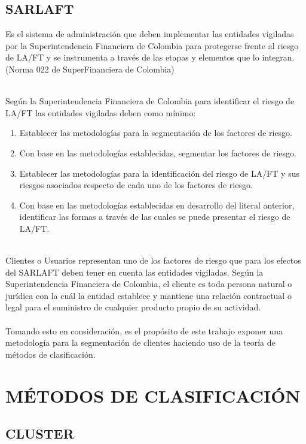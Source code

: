 \documentclass[letterpaper,12pt, spanish]{article}
\begin{document}
\subsection{SARLAFT}

Es el sistema de administración que deben implementar las entidades vigiladas por la Superintendencia Financiera de Colombia para protegerse frente al riesgo de LA/FT y se instrumenta a través de las etapas y elementos que lo integran. (Norma 022 de SuperFinanciera de Colombia)

\ \\
Según la Superintendencia Financiera de Colombia para identificar el riesgo de LA/FT las entidades vigiladas deben como mínimo:
\begin{enumerate}
  \item Establecer las metodologías para la segmentación de los factores de riesgo.
  \item Con base en las metodologías establecidas, segmentar los factores de riesgo.
  \item Establecer las metodologías para la identificación del riesgo de LA/FT y sus riesgos asociados respecto de cada uno de los factores de riesgo.
  \item Con base en las metodologías establecidas en desarrollo del literal anterior, identificar las formas a
      través de las cuales se puede presentar el riesgo de LA/FT.
\end{enumerate}
\ \\
Clientes o Usuarios representan uno de los factores de riesgo que para los efectos del SARLAFT deben tener en cuenta las entidades vigiladas. Según la Superintendencia Financiera de Colombia, el cliente es toda persona natural o jurídica con la cuál la entidad establece y mantiene una relación contractual o legal para el suministro de cualquier producto propio de su actividad.
\ \\
\ \\
Tomando esto en consideración, es el propósito de este trabajo exponer una metodología para la segmentación de clientes haciendo uso de la teoría de métodos de clasificación.

\section{MÉTODOS DE CLASIFICACIÓN}




\subsection{CLUSTER}
\end{document}
